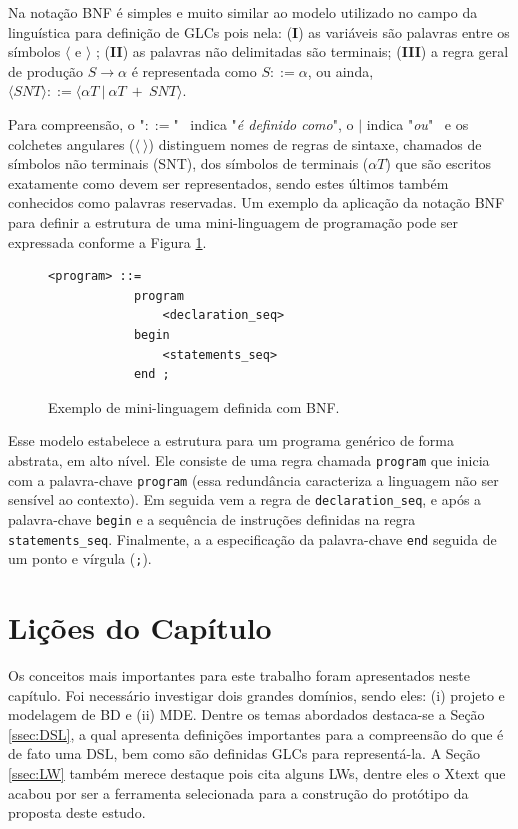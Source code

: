 Na notação \ac{BNF} é simples e muito similar ao modelo utilizado no campo da linguística para definição de \acp{GLC} pois nela: (\textbf{I}) as variáveis são palavras entre os símbolos $\langle$ e $\rangle$ ; (\textbf{II}) as palavras não delimitadas são terminais; (\textbf{III}) a regra geral de produção ${S\to \alpha}$ é representada como ${S ::= \alpha}$, ou ainda, $\langle SNT \rangle ::= \langle \alpha T~|~\alpha T~+~SNT \rangle$. 

Para compreensão, o "\texttt{$::=$}"~ indica "\textit{é definido como}", o \texttt{$|$} indica "\textit{ou}"~ e os colchetes angulares (\texttt{$\langle~\rangle$}) distinguem nomes de regras de sintaxe, chamados de símbolos não terminais (SNT), dos símbolos de terminais (\texttt{$\alpha T$}) que são escritos exatamente como devem ser representados, sendo estes últimos também conhecidos como palavras reservadas. 
Um exemplo da aplicação da notação \ac{BNF} para definir a estrutura de uma mini-linguagem de programação pode ser expressada conforme a Figura \ref{fig:MiniLanguage}.


\begin{figure}
    \centering
    \caption{Exemplo de mini-linguagem definida com \ac{BNF}.}
    \label{fig:MiniLanguage}
    \begin{scriptsize}
    \begin{lstlisting}[language = BNF , frame = trbl]
<program> ::= 
            program 
                <declaration_seq>
            begin
                <statements_seq>
            end ;
    \end{lstlisting}
    \end{scriptsize}
\end{figure}

Esse modelo estabelece a estrutura para um programa genérico de forma abstrata, em alto nível. 
Ele consiste de uma regra chamada \texttt{program} que inicia com a palavra-chave \texttt{program} (essa redundância caracteriza a linguagem não ser sensível ao contexto).
Em seguida vem a regra de \texttt{declaration\_seq}, e após a palavra-chave \texttt{begin} e a sequência de instruções definidas na regra \texttt{statements\_seq}.
Finalmente, a a especificação da palavra-chave \texttt{end} seguida de um ponto e vírgula (\texttt{;}). 

\section{Lições do Capítulo} \label{sec:LicoesFundamentacaoTeorica}

Os conceitos mais importantes para este trabalho foram apresentados neste capítulo. 
Foi necessário investigar dois grandes domínios, sendo eles: (i) projeto e modelagem de \ac{BD} e (ii) \ac{MDE}. 
Dentre os temas abordados destaca-se a Seção \ref{ssec:DSL}, a qual apresenta definições importantes para a compreensão do que é de fato uma \ac{DSL}, bem como são definidas \acp{GLC} para representá-la. 
A Seção \ref{ssec:LW} também merece destaque pois cita alguns \acp{LW}, dentre eles o Xtext que acabou por ser a ferramenta selecionada para a construção do protótipo da proposta deste estudo.